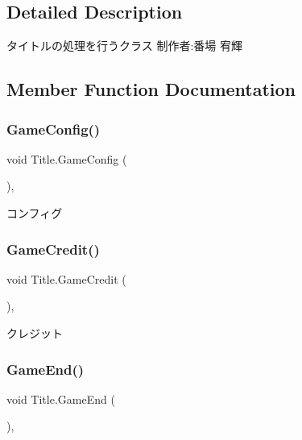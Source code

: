 \subsection{Detailed Description}
タイトルの処理を行うクラス 制作者\+:番場 宥輝 



\subsection{Member Function Documentation}
\mbox{\label{class_title_a8575b965680aab2b77361fbbe39153fb}} 
\subsubsection{\texorpdfstring{Game\+Config()}{GameConfig()}}
{\footnotesize\ttfamily void Title.\+Game\+Config (\begin{DoxyParamCaption}{ }\end{DoxyParamCaption})\hspace{0.3cm}{\ttfamily [inline]}, {\ttfamily [private]}}



コンフィグ 

\mbox{\label{class_title_a93b0e5587f2db785591511b3e2287a5a}} 
\subsubsection{\texorpdfstring{Game\+Credit()}{GameCredit()}}
{\footnotesize\ttfamily void Title.\+Game\+Credit (\begin{DoxyParamCaption}{ }\end{DoxyParamCaption})\hspace{0.3cm}{\ttfamily [inline]}, {\ttfamily [private]}}



クレジット 

\mbox{\label{class_title_af1a7258248297b2f84aea9fd3239e4e2}} 
\subsubsection{\texorpdfstring{Game\+End()}{GameEnd()}}
{\footnotesize\ttfamily void Title.\+Game\+End (\begin{DoxyParamCaption}{ }\end{DoxyParamCaption})\hspace{0.3cm}{\ttfamily [inline]}, {\ttfamily [private]}}



